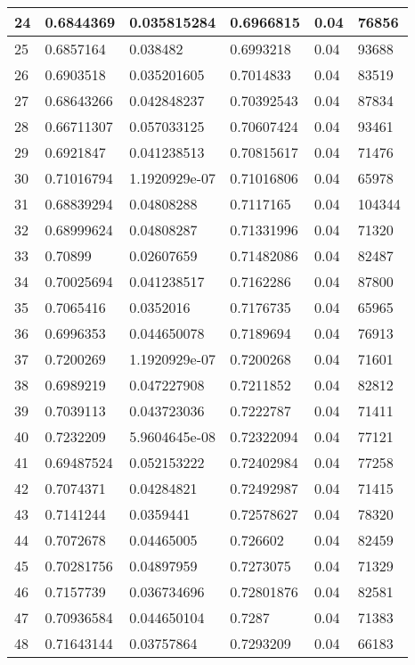\begin{longtable}{|l|l|l|l|l|l|}
24 & 0.6844369 & 0.035815284 & 0.6966815 & 0.04 & 76856 \\ \hline 
25 & 0.6857164 & 0.038482 & 0.6993218 & 0.04 & 93688 \\ \hline 
26 & 0.6903518 & 0.035201605 & 0.7014833 & 0.04 & 83519 \\ \hline 
27 & 0.68643266 & 0.042848237 & 0.70392543 & 0.04 & 87834 \\ \hline 
28 & 0.66711307 & 0.057033125 & 0.70607424 & 0.04 & 93461 \\ \hline 
29 & 0.6921847 & 0.041238513 & 0.70815617 & 0.04 & 71476 \\ \hline 
30 & 0.71016794 & 1.1920929e-07 & 0.71016806 & 0.04 & 65978 \\ \hline 
31 & 0.68839294 & 0.04808288 & 0.7117165 & 0.04 & 104344 \\ \hline 
32 & 0.68999624 & 0.04808287 & 0.71331996 & 0.04 & 71320 \\ \hline 
33 & 0.70899 & 0.02607659 & 0.71482086 & 0.04 & 82487 \\ \hline 
34 & 0.70025694 & 0.041238517 & 0.7162286 & 0.04 & 87800 \\ \hline 
35 & 0.7065416 & 0.0352016 & 0.7176735 & 0.04 & 65965 \\ \hline 
36 & 0.6996353 & 0.044650078 & 0.7189694 & 0.04 & 76913 \\ \hline 
37 & 0.7200269 & 1.1920929e-07 & 0.7200268 & 0.04 & 71601 \\ \hline 
38 & 0.6989219 & 0.047227908 & 0.7211852 & 0.04 & 82812 \\ \hline 
39 & 0.7039113 & 0.043723036 & 0.7222787 & 0.04 & 71411 \\ \hline 
40 & 0.7232209 & 5.9604645e-08 & 0.72322094 & 0.04 & 77121 \\ \hline 
41 & 0.69487524 & 0.052153222 & 0.72402984 & 0.04 & 77258 \\ \hline 
42 & 0.7074371 & 0.04284821 & 0.72492987 & 0.04 & 71415 \\ \hline 
43 & 0.7141244 & 0.0359441 & 0.72578627 & 0.04 & 78320 \\ \hline 
44 & 0.7072678 & 0.04465005 & 0.726602 & 0.04 & 82459 \\ \hline 
45 & 0.70281756 & 0.04897959 & 0.7273075 & 0.04 & 71329 \\ \hline 
46 & 0.7157739 & 0.036734696 & 0.72801876 & 0.04 & 82581 \\ \hline 
47 & 0.70936584 & 0.044650104 & 0.7287 & 0.04 & 71383 \\ \hline 
48 & 0.71643144 & 0.03757864 & 0.7293209 & 0.04 & 66183 \\ \hline 

\end{longtable}
